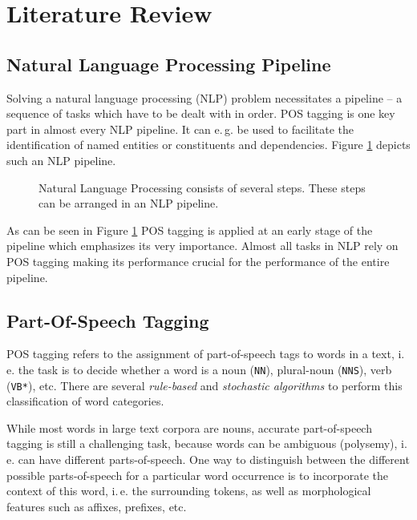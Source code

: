 \documentclass[twocolumns]{IEEEtran}
\begin{document}
\section{Literature Review}
\subsection{Natural Language Processing Pipeline}

Solving a natural language processing (NLP) problem necessitates a pipeline -- a sequence of tasks which have to be dealt with in order. POS tagging is one key part in almost every NLP pipeline. It can e.\,g. be used to facilitate the identification of named entities or constituents and dependencies. Figure \ref{fig:nlp-pipeline} depicts such an NLP pipeline.

\begin{figure}[h]
    \centering
    \caption{Natural Language Processing consists of several steps.
        These steps can be arranged in an NLP pipeline.}
    \label{fig:nlp-pipeline}
\end{figure}

As can be seen in Figure \ref{fig:nlp-pipeline} POS tagging is applied at an early stage of the pipeline which emphasizes its very importance. 
Almost all tasks in NLP rely on POS tagging making its performance crucial for the performance of the entire pipeline.

\subsection{Part-Of-Speech Tagging}
POS tagging refers to the assignment of part-of-speech tags to words in a text, i.\,e. the task is to decide whether a word is a noun (\texttt{NN}), plural-noun (\texttt{NNS}), verb (\texttt{VB*}), etc. There are several \textit{rule-based} and \textit{stochastic algorithms} to perform this classification of word categories.

While most words in large text corpora are nouns, accurate part-of-speech tagging is still a challenging task, because words can be ambiguous (polysemy), i.\,e. can have different parts-of-speech. One way to distinguish between the different possible parts-of-speech for a particular word occurrence is to incorporate the context of this word, i.\,e. the surrounding tokens, as well as morphological features such as affixes, prefixes, etc. \cite[cf. pages 167-170]{Jurafsky}
\end{document}
